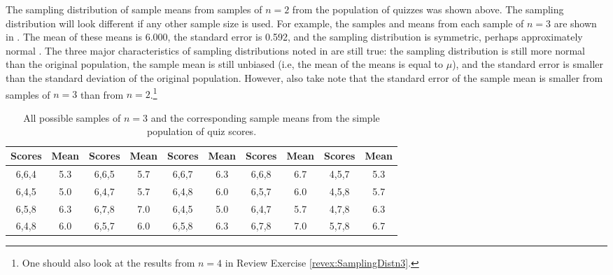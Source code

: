 \documentclass[10pt,openany]{book}\usepackage[]{graphicx}\usepackage[]{color}
\begin{document}
The sampling distribution of sample means from samples of $n=2$ from the population of quizzes was shown above.  The sampling distribution will look different if any other sample size is used.  For example, the samples and means from each sample of $n=3$ are shown in .  The mean of these means is 6.000, the standard error is 0.592, and the sampling distribution is symmetric, perhaps approximately normal .  The three major characteristics of sampling distributions noted in  are still true: the sampling distribution is still more normal than the original population, the sample mean is still unbiased (i.e, the mean of the means is equal to $\mu$), and the standard error is smaller than the standard deviation of the original population.  However, also take note that the standard error of the sample mean is smaller from samples of $n=3$ than from $n=2$.\footnote{One should also look at the results from $n=4$ in Review Exercise \ref{revex:SamplingDistn3}.}

\begin{table}[htbp]
  \caption{All possible samples of $n=3$ and the corresponding sample means from the simple population of quiz scores.}
  \label{tab:SDistQuiz3}
  \centering
    \begin{tabular}{cc||cc||cc||cc||cc}
\hline\hline
Scores & Mean & Scores & Mean & Scores &  Mean & Scores & Mean & Scores & Mean \\
\hline
6,6,4 & 5.3 & 6,6,5 & 5.7 & 6,6,7 & 6.3 & 6,6,8 & 6.7 & 4,5,7 & 5.3 \\
6,4,5 & 5.0 & 6,4,7 & 5.7 & 6,4,8 & 6.0 & 6,5,7 & 6.0 & 4,5,8 & 5.7 \\
6,5,8 & 6.3 & 6,7,8 & 7.0 & 6,4,5 & 5.0 & 6,4,7 & 5.7 & 4,7,8 & 6.3 \\
6,4,8 & 6.0 & 6,5,7 & 6.0 & 6,5,8 & 6.3 & 6,7,8 & 7.0 & 5,7,8 & 6.7 \\
\hline\hline
    \end{tabular}
\end{table}
\end{document}

